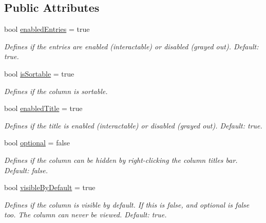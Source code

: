 \subsection*{Public Attributes}
\begin{DoxyCompactItemize}
\item 
bool \mbox{\hyperlink{class_g_u_i_extensions_1_1_table_column_a6c4958c3bcf3a93a78d575c9a41776fe}{enabled\+Entries}} = true
\begin{DoxyCompactList}\small\item\em Defines if the entries are enabled (interactable) or disabled (grayed out). Default\+: true. \end{DoxyCompactList}\item 
bool \mbox{\hyperlink{class_g_u_i_extensions_1_1_table_column_ad46a3aeba25051869bcad488eaa6f9dc}{is\+Sortable}} = true
\begin{DoxyCompactList}\small\item\em Defines if the column is sortable. \end{DoxyCompactList}\item 
bool \mbox{\hyperlink{class_g_u_i_extensions_1_1_table_column_a9fe6044251cdd55a22469a638ead7d7f}{enabled\+Title}} = true
\begin{DoxyCompactList}\small\item\em Defines if the title is enabled (interactable) or disabled (grayed out). Default\+: true. \end{DoxyCompactList}\item 
bool \mbox{\hyperlink{class_g_u_i_extensions_1_1_table_column_ac09648f6d91b018cae5c80bcd7499630}{optional}} = false
\begin{DoxyCompactList}\small\item\em Defines if the column can be hidden by right-\/clicking the column titles bar. Default\+: false. \end{DoxyCompactList}\item 
bool \mbox{\hyperlink{class_g_u_i_extensions_1_1_table_column_af0cd04c373e963e227a4bfb4da234f77}{visible\+By\+Default}} = true
\begin{DoxyCompactList}\small\item\em Defines if the column is visible by default. If this is false, and optional is false too. The column can never be viewed. Default\+: true. \end{DoxyCompactList}\end{DoxyCompactItemize}
